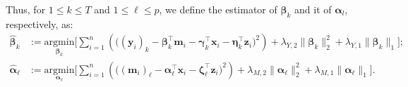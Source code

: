 \documentclass[
  12pt]{article}
\def\M{\mathbf{m}}
\def\X{\mathbf{x}}
\def\Y{\mathbf{y}}
\def\Z{\mathbf{z}}
\begin{document}
Thus, for $1 \leq k \leq T$ and $1 \leq \ell \leq p$, we define the estimator of $\bm{\beta}_{k}$ and it of $\bm{\alpha}_{l}$, respectively, as:
\begin{align}
\widehat{\bm{\beta}}_{k} &:=  \underset{   {\bm{\beta}_{k} } }{ \textrm{argmin} }  \Bigg[  \sum_{i=1}^{n}  \left(   \big(  (\Y_{i})_{k}   -     \bm{\beta}_{k}^{\top} \M_{i} -   \bm{\gamma}_{k}^{\top}\X_{i}   -   \bm{\eta}_{k}^{\top} \Z_{i}
\big)^{2}
\right)
+  \lambda_{Y,2}  \big\|  \bm{\beta}_{k}   \big\|_{2}^{2}   +    \lambda_{Y,1}    \big\|  \bm{\beta}_{k} \big\|_{1}  \Bigg];
\nonumber
\\
\widehat{\bm{\alpha}}_{\ell} &:=  \underset{   {\bm{\alpha}_{\ell} } }{ \textrm{argmin} }  \Bigg[  \sum_{i=1}^{n}  \left(   \big(  (\M_{i})_{\ell}   -  \bm{\alpha}_{\ell}^{\top} \X_{i}   -    \bm{\zeta}_{\ell}^{\top} \Z_{i}
\big)^{2}   	\right)
+  \lambda_{M,2}  \big\|  \bm{\alpha}_{\ell}   \big\|_{2}^{2}   +    \lambda_{M,1}    \big\|  \bm{\alpha}_{\ell} \big\|_{1}  \Bigg].  	
\label{equa:elastic.net:estimator:beta_k:def}
\end{align}

\medskip
\end{document}
